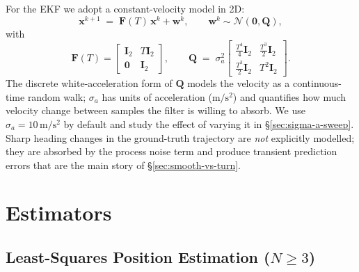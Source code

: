 \documentclass[11pt,a4paper]{article}
\begin{document}
For the EKF we adopt a constant-velocity model in 2D:
\begin{equation}
  \mathbf{x}^{k+1} \;=\; \mathbf{F}(T)\, \mathbf{x}^k + \mathbf{w}^k,
  \qquad \mathbf{w}^k \sim \mathcal{N}(\mathbf{0}, \mathbf{Q}),
\end{equation}
with
\begin{equation}
  \mathbf{F}(T) =
  \begin{bmatrix}
    \mathbf{I}_2 & T \mathbf{I}_2 \\
    \mathbf{0}    & \mathbf{I}_2
  \end{bmatrix},
  \qquad
  \mathbf{Q} \;=\; \sigma_a^2
  \begin{bmatrix}
    \tfrac{T^4}{4}\mathbf{I}_2 & \tfrac{T^3}{2}\mathbf{I}_2 \\[2pt]
    \tfrac{T^3}{2}\mathbf{I}_2 & T^2 \mathbf{I}_2
  \end{bmatrix}.
  \label{eq:cv-Q}
\end{equation}
The discrete white-acceleration form of $\mathbf{Q}$ models the velocity as
a continuous-time random walk; $\sigma_a$ has units of acceleration
($\mathrm{m/s^2}$) and quantifies how much velocity change between samples
the filter is willing to absorb.  We use $\sigma_a = 10\,\mathrm{m/s^2}$ by
default and study the effect of varying it in
\S\ref{sec:sigma-a-sweep}.  Sharp heading changes in the ground-truth
trajectory are \emph{not} explicitly modelled; they are absorbed by the
process noise term and produce transient prediction errors that are the
main story of \S\ref{sec:smooth-vs-turn}.

\section{Estimators}
\label{sec:estimators}

\subsection{Least-Squares Position Estimation ($N \ge 3$)}
\end{document}
